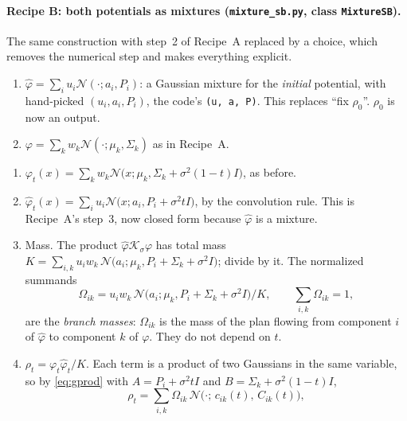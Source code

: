 \documentclass[11pt]{article}
\newcommand{\code}[1]{\texttt{#1}}
\newcommand{\Nc}{\mathcal{N}}
\newcommand{\Kc}{\mathcal{K}}
\newcommand{\hphi}{\hat\varphi}
\theoremstyle{definition}
\theoremstyle{plain}
\begin{document}
\paragraph{Recipe B: both potentials as mixtures (\code{mixture\_sb.py}, class \code{MixtureSB}).}
The same construction with step~2 of Recipe~A replaced by a choice, which removes the numerical
step and makes everything explicit.
\begin{description}[leftmargin=1.5em,itemsep=2pt]
  \item[We fix two things, neither of which is a marginal.]
    \begin{enumerate}[itemsep=1pt]
      \item $\hphi=\sum_iu_i\Nc(\cdot;a_i,P_i)$: a Gaussian mixture for the \emph{initial}
            potential, with hand-picked $(u_i,a_i,P_i)$, the code's \code{(u, a, P)}. This
            replaces ``fix $\rho_0$''. $\rho_0$ is now an output.
      \item $\varphi=\sum_kw_k\Nc(\cdot;\mu_k,\Sigma_k)$ as in Recipe~A.
    \end{enumerate}
  \item[Everything else is derived.]
    \begin{enumerate}[itemsep=1pt]
      \item $\varphi_t(x)=\sum_kw_k\Nc\big(x;\mu_k,\Sigma_k+\sigma^2(1-t)I\big)$, as before.
      \item $\hphi_t(x)=\sum_iu_i\Nc\big(x;a_i,P_i+\sigma^2tI\big)$, by the convolution rule.
            This is Recipe~A's step~3, now closed form because $\hphi$ is a mixture.
      \item Mass. The product $\hphi\Kc_\sigma\varphi$ has total mass
            $K=\sum_{i,k}u_iw_k\,\Nc\big(a_i;\mu_k,P_i+\Sigma_k+\sigma^2I\big)$; divide by it.
            The normalized summands
            \[
              \Omega_{ik}=u_iw_k\,\Nc\big(a_i;\mu_k,P_i+\Sigma_k+\sigma^2I\big)\big/K,
              \qquad\textstyle\sum_{i,k}\Omega_{ik}=1,
            \]
            are the \emph{branch masses}: $\Omega_{ik}$ is the mass of the plan flowing from
            component $i$ of $\hphi$ to component $k$ of $\varphi$. They do not depend on $t$.
      \item $\rho_t=\varphi_t\hphi_t/K$. Each term is a product of two Gaussians in the same
            variable, so by \eqref{eq:gprod} with $A=P_i+\sigma^2tI$ and $B=\Sigma_k+\sigma^2(1-t)I$,
            \begin{equation}
              \label{eq:ourrho}
              \rho_t=\sum_{i,k}\Omega_{ik}\,\Nc\big(\cdot;\,c_{ik}(t),\,C_{ik}(t)\big),

\end{equation}
\end{enumerate}
\end{description}
\end{document}
